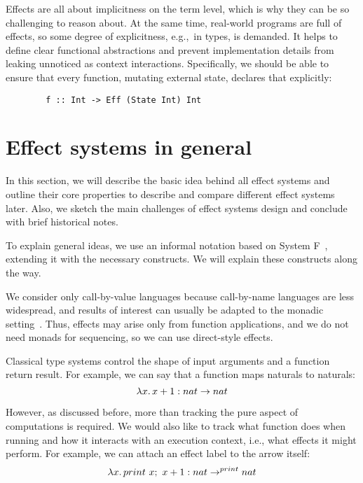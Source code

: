\documentclass[conference]{IEEEtran}
\newcommand{\seq}{;~}
\newcommand{\ap}{~}
\begin{document}
    Effects are all about implicitness on the term level, which is why they can be so challenging to reason about.
    At the same time, real-world programs are full of effects, so some degree of explicitness, e.g.,\ in types, is demanded.
    It helps to define clear functional abstractions and prevent implementation details from leaking unnoticed as context interactions.
    Specifically, we should be able to ensure that every function, mutating external state, declares that explicitly:
    \begin{verbatim}
        f :: Int -> Eff (State Int) Int
    \end{verbatim}


    \section{Effect systems in general}

    In this section, we will describe the basic idea behind all effect systems and outline their core properties to describe and compare different effect systems later.
    Also, we sketch the main challenges of effect systems design and conclude with brief historical notes.

    To explain general ideas, we use an informal notation based on System F~\cite{girard1971extension}, extending it with the necessary constructs.
    We will explain these constructs along the way.

    We consider only call-by-value languages because call-by-name languages are less widespread, and results of interest can usually be adapted to the monadic setting~\cite{wadler2003marriage}.
    Thus, effects may arise only from function applications, and we do not need monads for sequencing, so we can use direct-style effects.


    Classical type systems control the shape of input arguments and a function return result.
    For example, we can say that a function maps naturals to naturals:
    \[\lambda x\ldotp x + 1 : nat\to nat\]

    However, as discussed before, more than tracking the pure aspect of computations is required.
    We would also like to track what function does when running and how it interacts with an execution context, i.e., what effects it might perform.
    For example, we can attach an effect label to the arrow itself:
    \[\lambda x\ldotp print \ap x\seq x + 1 : nat\to^{print} nat\]
\end{document}
